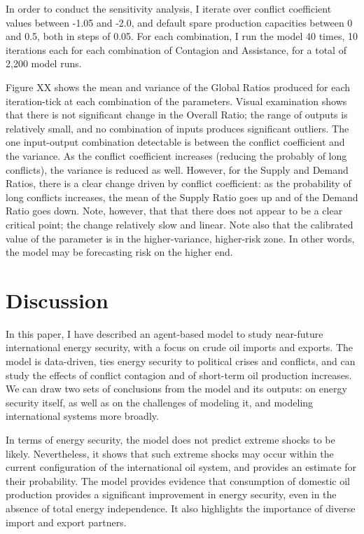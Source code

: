 \documentclass{article}
\begin{document}
In order to conduct the sensitivity analysis, I iterate over conflict coefficient values between -1.05 and -2.0, and default spare production capacities between 0 and 0.5, both in steps of 0.05. For each combination, I run the model 40 times, 10 iterations each for each combination of Contagion and Assistance, for a total of 2,200 model runs. 

Figure XX shows the mean and variance of the Global Ratios produced for each iteration-tick at each combination of the parameters. Visual examination shows that there is not significant change in the Overall Ratio; the range of outputs is relatively small, and no combination of inputs produces significant outliers. The one input-output combination detectable is between the conflict coefficient and the variance. As the conflict coefficient increases (reducing the probably of long conflicts), the variance is reduced as well. However, for the Supply and Demand Ratios, there is a clear change driven by conflict coefficient: as the probability of long conflicts increases, the mean of the Supply Ratio goes up and of the Demand Ratio goes down. Note, however, that that there does not appear to be a clear critical point; the change relatively slow and linear. Note also that the calibrated value of the parameter is in the higher-variance, higher-risk zone. In other words, the model may be forecasting risk on the higher end. 



\section{Discussion}

In this paper, I have described an agent-based model to study near-future international energy security, with a focus on crude oil imports and exports. The model is data-driven, ties energy security to political crises and conflicts, and can study the effects of conflict contagion and of short-term oil production increases. We can draw two sets of conclusions from the model and its outputs: on energy security itself, as well as on the challenges of modeling it, and modeling international systems more broadly.

In terms of energy security, the model does not predict extreme shocks to be likely. Nevertheless, it shows that such extreme shocks may occur within the current configuration of the international oil system, and provides an estimate for their probability. The model provides evidence that consumption of domestic oil production provides a significant improvement in energy security, even in the absence of total energy independence. It also highlights the importance of diverse import and export partners. 
\end{document}
